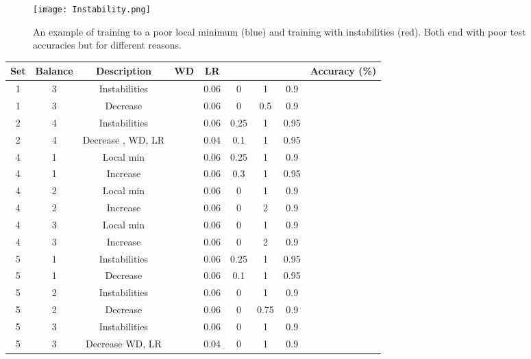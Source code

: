 \documentclass[final]{cvpr}
\newcommand{\HPs}{hyper-parameters }
\begin{document}
\begin{figure}[t]
	\begin{center}
\texttt{[image: Instability.png]}
	\end{center}
	\caption{An example of training to a poor local minimum (blue) and training with instabilities (red). Both end with poor test accuracies but for different reasons. }
	\label{fig:instability}
\end{figure}



\begin{table*}
	\begin{center}
		\begin{tabular}{|c|c|c|c|c|c|c|c|c|}
			\hline
			Set  & Balance & Description & WD & LR &  &  &  & Accuracy (\%)    \\
			\hline\hline
			1 & 3  & Instabilities  &  & 0.06 &  0  &  1 & 0.9   &    \\
			\hline
			1 & 3  & Decrease   &  & 0.06 &  0  & 0.5 & 0.9   &    \\
			\hline\hline
			2 & 4  & Instabilities  &  & 0.06 &  0.25  &  1 & 0.95   &    \\
			\hline
			2 & 4  & Decrease , WD, LR  &  & 0.04 &  0.1  & 1 & 0.95   &    \\
			\hline\hline
			4 & 1  & Local min  &  & 0.06 &  0.25  &  1 & 0.9   &    \\
			\hline
			4 & 1  & Increase   &  & 0.06 &  0.3  &  1 & 0.95   &    \\
			\hline\hline
			4 & 2  & Local min  &  & 0.06 &  0  &  1 & 0.9   &    \\
			\hline
			4 & 2  & Increase   &  & 0.06 &  0  &  2 & 0.9   &    \\
			\hline\hline
			4 & 3  & Local min  &  & 0.06 &  0  &  1 & 0.9   &    \\
			\hline
			4 & 3  & Increase   &  & 0.06 &  0  &  2 & 0.9   &    \\
			\hline\hline
			5 & 1  & Instabilities  &  & 0.06 &  0.25  &  1 & 0.95   &    \\
			\hline
			5 & 1  & Decrease   &  & 0.06 &  0.1  &  1 & 0.95   &    \\
			\hline\hline
			5 & 2  & Instabilities  &  & 0.06 &  0  &  1 & 0.9   &    \\
			\hline
			5 & 2  & Decrease   &  & 0.06 &  0  &  0.75 & 0.9   &    \\
			\hline\hline
			5 & 3  & Instabilities  &  & 0.06 &  0  &  1 & 0.9   &    \\
			\hline
			5 & 3  & Decrease WD, LR  &  & 0.04 &  0  &  1 & 0.9   &    \\
			\hline
		\end{tabular}
	\end{center}
	\caption{Illustration of the sensitivity to the \HPs WD, LR, ,  and .  See the text for guidance on how to tune these hyper-parameters for situations with inferior performance due to instabilities or local minimums. 
	}
	\label{tab:tuneHP}
\end{table*}
\end{document}
